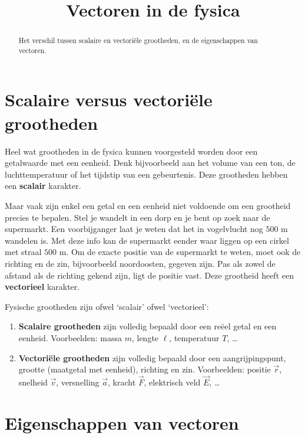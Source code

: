 \documentclass{ximera}
\title{Vectoren in de fysica}
\begin{document}
\begin{abstract}
    Het verschil tussen scalaire en vectoriële grootheden, en de eigenschappen van vectoren.
\end{abstract}
\maketitle

\section{Scalaire versus vectoriële grootheden}

Heel wat grootheden in de fysica kunnen voorgesteld worden door een getalwaarde met een eenheid. Denk bijvoorbeeld aan het volume van een ton, de luchttemperatuur of het tijdstip van een gebeurtenis. Deze grootheden hebben een \textbf{scalair} karakter.

Maar vaak zijn enkel een getal en een eenheid niet voldoende om een grootheid precies te bepalen. Stel je wandelt in een dorp en je bent op zoek naar de supermarkt. Een voorbijganger laat je weten dat het in vogelvlucht nog $500\text{ m}$ wandelen is. Met deze info kan de supermarkt eender waar liggen op een cirkel met straal $500\text{ m}$. Om de exacte positie van de supermarkt te weten, moet ook de richting en de zin, bijvoorbeeld noordoosten, gegeven zijn. Pas als zowel de afstand als de richting gekend zijn, ligt de positie vast. Deze grootheid heeft een \textbf{vectorieel} karakter.

\begin{definition}[title={Scalaire en vectoriële grootheden}]\nl
    Fysische grootheden zijn ofwel `scalair' ofwel `vectorieel': 
    \begin{enumerate}
        \item \textbf{Scalaire grootheden} zijn volledig bepaald door een reëel getal en een eenheid. 
        Voorbeelden: massa $m$, lengte $\ell$, temperatuur $T$, \dots
        \item \textbf{Vectoriële grootheden} zijn volledig bepaald door een aangrijpingspunt, grootte (maatgetal met eenheid), richting en zin. 
        Voorbeelden: positie $\vec{r}$, snelheid $\vec{v}$, versnelling $\vec{a}$, kracht $\vec{F}$, elektrisch veld $\vec{E}$, \dots
    \end{enumerate}
\end{definition}

\section{Eigenschappen van vectoren}
\end{document}

